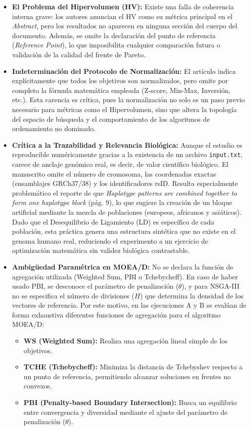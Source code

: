 \documentclass[a4paper,10pt]{article}
\begin{document}
\begin{itemize}
    \item \textbf{El Problema del Hipervolumen (HV):} Existe una falla de coherencia interna grave: los autores anuncian el HV como su métrica principal en el \textit{Abstract}, pero los resultados no aparecen en ninguna sección del cuerpo del documento. Además, se omite la declaración del punto de referencia (\textit{Reference Point}), lo que imposibilita cualquier comparación futura o validación de la calidad del frente de Pareto.
    \item \textbf{Indeterminación del Protocolo de Normalización:} El artículo indica explícitamente que \guillemotleft todos los objetivos son normalizados\guillemotright, pero omite por completo la fórmula matemática empleada (Z-score, Min-Max, Inversión, etc.). Esta carencia es crítica, pues la normalización no solo es un paso previo necesario para métricas como el Hipervolumen, sino que altera la topología del espacio de búsqueda y el comportamiento de los algoritmos de ordenamiento no dominado.
    \item \textbf{Crítica a la Trazabilidad y Relevancia Biológica:} Aunque el estudio es reproducible numéricamente gracias a la existencia de un archivo \texttt{input.txt}, carece de anclaje genómico real, es decir, de valor científico biológico. El manuscrito omite el número de cromosoma, las coordenadas exactas (ensamblajes GRCh37/38) y los identificadores rsID. Resulta especialmente problemático el reporte de que \textit{\guillemotleft Haplotype patterns are combined together to form one haplotype block\guillemotright} (pág. 9), lo que sugiere la creación de un bloque artificial mediante la mezcla de poblaciones (europeos, africanos y asiáticos). Dado que el Desequilibrio de Ligamiento (LD) es específico de cada población, esta práctica genera una estructura sintética que no existe en el genoma humano real, reduciendo el experimento a un ejercicio de optimización matemática sin validez biológica contrastable.
    \item \textbf{Ambigüedad Paramétrica en MOEA/D:} No se declara la función de agregación utilizada (Weighted Sum, PBI o Tchebycheff). En caso de haber usado PBI, se desconoce el parámetro de penalización ($\theta$), y para NSGA-III no se especifica el número de divisiones ($H$) que determina la densidad de los vectores de referencia.
    Por este motivo, en las ejecuciones A y B se evalúan de forma exhaustiva diferentes funciones de agregación para el algoritmo MOEA/D: 
    \begin{itemize}
        \item \textbf{WS (Weighted Sum):} Realiza una agregación lineal simple de los objetivos.
        \item \textbf{TCHE (Tchebycheff):} Minimiza la distancia de Tchebyshev respecto a un punto de referencia, permitiendo alcanzar soluciones en frentes no convexos.
        \item \textbf{PBI (Penalty-based Boundary Intersection):} Busca un equilibrio entre convergencia y diversidad mediante el ajuste del parámetro de penalización ($\theta$).
    \end{itemize}
\end{itemize}
\end{document}
